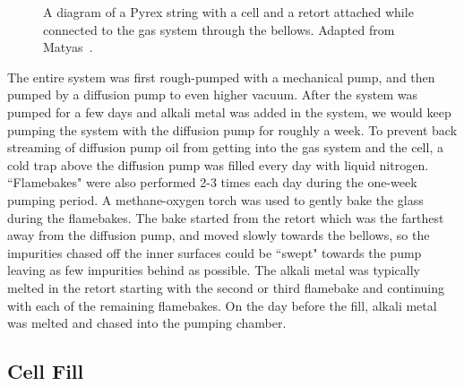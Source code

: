 \begin{figure}[t!]
	\centering
	\caption{{A diagram of a Pyrex string with a cell and a retort attached while connected to the gas system through the bellows. Adapted from Matyas~\cite{DanThesis}.}}
	\label{cell_gas_system}
\end{figure}

The entire system was first rough-pumped with a mechanical pump, and then pumped by a diffusion pump to even higher vacuum. After the system was pumped for a few days and alkali metal was added in the system, we would keep pumping the system with the diffusion pump for roughly a week. To prevent back streaming of diffusion pump oil from getting into the gas system and the cell, a cold trap above the diffusion pump was filled every day with liquid nitrogen. ``Flamebakes" were also performed 2-3 times each day during the one-week pumping period. A methane-oxygen torch was used to gently bake the glass during the flamebakes. The bake started from the retort which was the farthest away from the diffusion pump, and moved slowly towards the bellows, so the impurities chased off the inner surfaces could be ``swept" towards the pump leaving as few impurities behind as possible. The alkali metal was typically melted in the retort starting with the second or third flamebake and continuing with each of the remaining flamebakes. On the day before the fill, alkali metal was melted and chased into the pumping chamber.

\subsection{Cell Fill}

